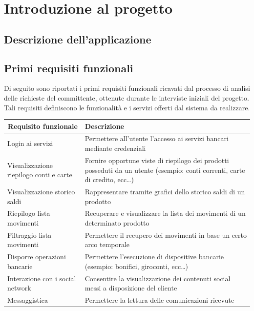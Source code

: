 \chapter{Introduzione al progetto}

\section{Descrizione dell'applicazione}



\section{Primi requisiti funzionali}
Di seguito sono riportati i primi requisiti funzionali ricavati dal processo di analisi delle richieste del committente, ottenute durante le interviste iniziali del progetto. Tali requisiti definiscono le funzionalità e i servizi 
offerti dal sistema da realizzare.

\begin{center}

    \begin{tabular}{p{6cm}|p{8cm}}

    \toprule
    \multicolumn{1}{c}{\textbf{Requisito funzionale}} &
    \textbf{Descrizione}\\

    \midrule
    Login ai servizi & Permettere all'utente l'accesso ai servizi bancari mediante credenziali \\
    Visualizzazione riepilogo conti e carte & Fornire opportune viste di riepilogo dei prodotti posseduti da un utente (esempio: conti correnti, carte di credito, ecc\dots)\\
    Visualizzazione storico saldi & Rappresentare tramite grafici dello storico saldi di un prodotto\\
    Riepilogo lista movimenti & Recuperare e visualizzare la lista dei movimenti di un determinato prodotto\\
    Filtraggio lista movimenti & Permettere il recupero dei movimenti in base un certo arco temporale\\
    Disporre operazioni bancarie & Permettere l'esecuzione di dispositive bancarie (esempio: bonifici, giroconti, ecc\dots) \\
    Interazione con i social network & Consentire la visualizzazione dei contenuti social messi a disposizione del cliente\\
    Messaggistica & Permettere la lettura delle comunicazioni ricevute  \\
    \bottomrule

    \end{tabular}
        \label{tab:requisiti_iniziali}

\end{center}



